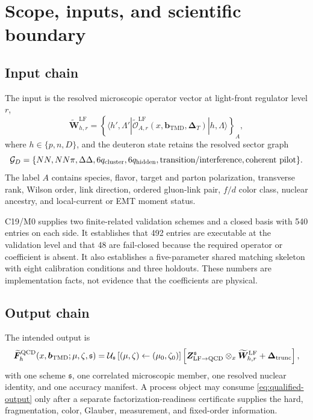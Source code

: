 \documentclass[11pt]{article}
\newcommand{\LF}{\mathrm{LF}}
\newcommand{\QCD}{\mathrm{QCD}}
\newcommand{\bM}{\bm b_{\mathrm{TMD}}}
\newcommand{\DT}{\bm\Delta_T}
\newcommand{\cO}{\mathcal O}
\newcommand{\cG}{\mathcal G}
\newcommand{\cU}{\mathcal U}
\newcommand{\otimesx}{\mathbin{\otimes_x}}
\begin{document}
\tableofcontents
\newpage

\section{Scope, inputs, and scientific boundary}
\label{sec:scope}

\subsection{Input chain}

The input is the resolved microscopic operator vector at light-front regulator level \(r\),
\begin{equation}
 \widetilde{\bm W}^{\LF}_{h,r}
 =
 \left\{
 \langle h',\Lambda'|
 \widetilde{\cO}^{\LF}_{A,r}
 (x,\bM,\DT)
 |h,\Lambda\rangle
 \right\}_{A},
 \label{eq:lf-input-vector}
\end{equation}
where \(h\in\{p,n,D\}\), and the deuteron state retains the resolved sector graph
\begin{equation}
 \cG_D=
 \{NN,NN\pi,\Delta\Delta,6q_{\rm cluster},6q_{\rm hidden},
 \text{transition/interference},\text{coherent pilot}\}.
 \label{eq:nuclear-graph}
\end{equation}
The label \(A\) contains species, flavor, target and parton polarization, transverse rank, Wilson order, link direction, ordered gluon-link pair, \(f/d\) color class, nuclear ancestry, and local-current or EMT moment status.

C19/M0 supplies two finite-related validation schemes and a closed basis with 540 entries on each side.  It establishes that 492 entries are executable at the validation level and that 48 are fail-closed because the required operator or coefficient is absent.  It also establishes a five-parameter shared matching skeleton with eight calibration conditions and three holdouts.  These numbers are implementation facts, not evidence that the coefficients are physical.

\subsection{Output chain}

The intended output is
\begin{equation}
 \widetilde{\bm F}_{h}^{\QCD}
 (x,\bM;\mu,\zeta,\mathfrak s)
 =
 \cU_{\mathfrak s}
 \left[(\mu,\zeta)\leftarrow(\mu_0,\zeta_0)\right]
 \left[
 \bm Z_{\LF\to\QCD}^{\mathfrak s}
 \otimesx
 \widetilde{\bm W}^{\LF}_{h,r}
 +\bm\Delta_{\rm trunc}
 \right],
 \label{eq:qualified-output}
\end{equation}
with one scheme \(\mathfrak s\), one correlated microscopic member, one resolved nuclear identity, and one accuracy manifest.  A process object may consume \cref{eq:qualified-output} only after a separate factorization-readiness certificate supplies the hard, fragmentation, color, Glauber, measurement, and fixed-order information.
\end{document}
